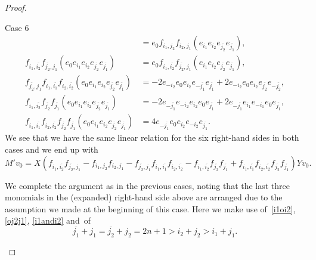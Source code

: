 \documentclass[10pt,a4paper]{article}
\theoremstyle{remark}\newtheorem{rema}[theo]{Remark}
\newenvironment{enonce*}[2][]{\par\smallskip\noindent\textbf{#2.}\ }{\par\smallskip}
\begin{document}
\begin{proof}
\begin{enonce*}[remark]{Case 6}
\begin{align*}
&=e_0f_{i_1,j_2}f_{i_2,j_1}(e_{i_1}e_{i_2}e_{\overline{j_2}}e_{\overline{j_1}}),
\\
f_{i_1,\overline{i_2}}f_{\overline{j_2},j_1}(e_0e_{i_1}e_{i_2}e_{\overline{j_2}}e_{\overline{j_1}})
&=e_0f_{i_1,\overline{i_2}}f_{\overline{j_2},j_1}(e_{i_1}e_{i_2}e_{\overline{j_2}}e_{\overline{j_1}}),
\\
f_{\overline{j_2},j_1}f_{i_1,\overline{i_1}}f_{i_2,\overline{i_2}}(e_0e_{i_1}e_{i_2}e_{\overline{j_2}}e_{\overline{j_1}})
&=-2e_{-i_2}e_{0}e_{i_2}e_{-\overline{j_1}}e_{\overline{j_1}}+2e_{-i_2}e_{0}e_{i_2}e_{\overline{j_2}}e_{-\overline{j_2}},
\\
f_{i_1,\overline{i_2}}f_{\overline{j_2}}f_{\overline{j_1}}(e_0e_{i_1}e_{i_2}e_{\overline{j_2}}e_{\overline{j_1}})
&=-2e_{-\overline{j_1}}e_{-i_2}e_{i_2}e_{0}e_{\overline{j_1}}+2e_{-\overline{j_1}}e_{i_1}e_{-i_1}e_{0}e_{\overline{j_1}},
\\
f_{i_1,\overline{i_1}}f_{i_2,\overline{i_2}}f_{\overline{j_2}}f_{\overline{j_1}}(e_0e_{i_1}e_{i_2}e_{\overline{j_2}}e_{\overline{j_1}})
&=4e_{-\overline{j_1}}e_{0}e_{i_2}e_{-i_2}e_{\overline{j_1}}.
\end{align*}
We see that we have the same linear relation for the six right-hand sides in both cases and we end up with
\[
M'v_0=X(f_{i_1,\overline{i_2}}f_{\overline{j_2},j_1}-f_{i_1,j_2}f_{i_2,j_1}-f_{\overline{j_2},j_1}f_{i_1,\overline{i_1}}f_{i_2,\overline{i_2}}-f_{i_1,\overline{i_2}}f_{\overline{j_2}}f_{\overline{j_1}}+f_{i_1,\overline{i_1}}f_{i_2,\overline{i_2}}f_{\overline{j_2}}f_{\overline{j_1}})Yv_0.
\]

We complete the argument as in the previous cases, noting that the last three monomials in the (expanded) right-hand side above are arranged due to the assumption we made at the beginning of this case. Here we make use of~\eqref{i1oi2}, \eqref{oj2j1}, \eqref{i1andi2} and~of
\begin{equation}\label{oj1andoj2}
\overline{j_1}+j_1=\overline{j_2}+j_2=2n+1>i_2+j_2>i_1+j_1.
\end{equation}


\end{enonce*}
\end{proof}
\end{document}
